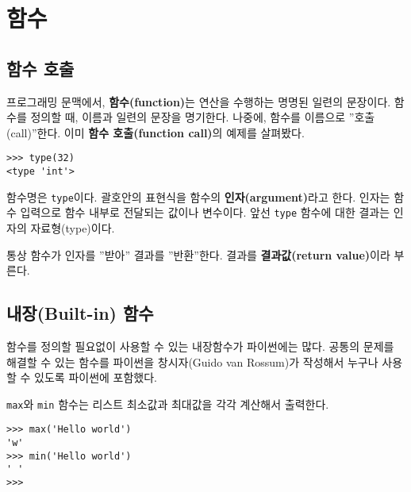 \chapter{함수}
\label{funcchap}

\section{함수 호출}
\label{functionchap}

프로그래밍 문맥에서, {\bf 함수(function)}는 연산을 수행하는 명명된 일련의 문장이다. 
함수를 정의할 때, 이름과 일련의 문장을 명기한다. 
나중에, 함수를 이름으로 ''호출(call)''한다.
이미 {\bf 함수 호출(function call)}의 예제를 살펴봤다.

\beforeverb
\begin{verbatim}
>>> type(32)
<type 'int'>
\end{verbatim}
\afterverb
%

함수명은 {\tt type}이다. 
괄호안의 표현식을 함수의 {\bf 인자(argument)}라고 한다. 
인자는 함수 입력으로 함수 내부로 전달되는 값이나 변수이다. 
앞선 {\tt type} 함수에 대한 결과는 인자의 자료형(type)이다.


통상 함수가 인자를 ''받아'' 결과를 ''반환''한다. 결과를 {\bf 결과값(return value)}이라 부른다.


\section{내장(Built-in) 함수}

함수를 정의할 필요없이 사용할 수 있는 내장함수가 파이썬에는 많다.
공통의 문제를 해결할 수 있는 함수를 파이썬을 창시자(Guido van Rossum)가 작성해서 누구나 사용할 수 있도록 파이썬에 포함했다.

{\tt max}와 {\tt min} 함수는 리스트 최소값과 최대값을 각각 계산해서 출력한다.

\beforeverb
\begin{verbatim}
>>> max('Hello world')
'w'
>>> min('Hello world')
' '
>>>
\end{verbatim}
\afterverb
%


